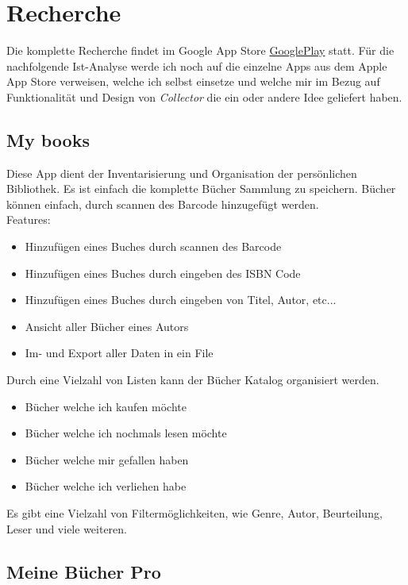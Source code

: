 \chapter{Recherche}
\label{ch:recherche}

Die komplette Recherche findet im Google App Store \href{https://play.google.com/store/apps}{GooglePlay} statt. Für die nachfolgende Ist-Analyse werde ich noch auf die einzelne Apps aus dem Apple App Store verweisen, welche ich selbst einsetze und welche mir im Bezug auf Funktionalität und Design von \emph{Collector} die ein oder andere Idee geliefert haben.

\section{My books}

Diese App dient der Inventarisierung und Organisation der persönlichen Bibliothek. Es ist einfach die komplette Bücher Sammlung zu speichern. Bücher können einfach, durch scannen des Barcode hinzugefügt werden.\\

Features:
\begin{itemize}
	\item Hinzufügen eines Buches durch scannen des Barcode
	\item Hinzufügen eines Buches durch eingeben des ISBN Code
	\item Hinzufügen eines Buches durch eingeben von Titel, Autor, etc...
	\item Ansicht aller Bücher eines Autors
	\item Im- und Export aller Daten in ein File
\end{itemize}

Durch eine Vielzahl von Listen kann der Bücher Katalog organisiert werden.
\begin{itemize}
	\item Bücher welche ich kaufen möchte
	\item Bücher welche ich nochmals lesen möchte
	\item Bücher welche mir gefallen haben
	\item Bücher welche ich verliehen habe
\end{itemize} 

Es gibt eine Vielzahl von Filtermöglichkeiten, wie Genre, Autor, Beurteilung, Leser und viele weiteren.\cite{MyBooks}

\section{Meine Bücher Pro}

